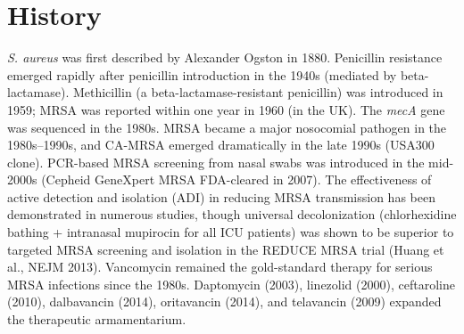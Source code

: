 \section*{History}
\textit{S. aureus} was first described by Alexander Ogston in 1880. Penicillin resistance emerged rapidly after penicillin introduction in the 1940s (mediated by beta-lactamase). Methicillin (a beta-lactamase-resistant penicillin) was introduced in 1959; MRSA was reported within one year in 1960 (in the UK). The \textit{mecA} gene was sequenced in the 1980s. MRSA became a major nosocomial pathogen in the 1980s--1990s, and CA-MRSA emerged dramatically in the late 1990s (USA300 clone). PCR-based MRSA screening from nasal swabs was introduced in the mid-2000s (Cepheid GeneXpert MRSA FDA-cleared in 2007). The effectiveness of active detection and isolation (ADI) in reducing MRSA transmission has been demonstrated in numerous studies, though universal decolonization (chlorhexidine bathing + intranasal mupirocin for all ICU patients) was shown to be superior to targeted MRSA screening and isolation in the REDUCE MRSA trial (Huang et al., NEJM 2013). Vancomycin remained the gold-standard therapy for serious MRSA infections since the 1980s. Daptomycin (2003), linezolid (2000), ceftaroline (2010), dalbavancin (2014), oritavancin (2014), and telavancin (2009) expanded the therapeutic armamentarium.

